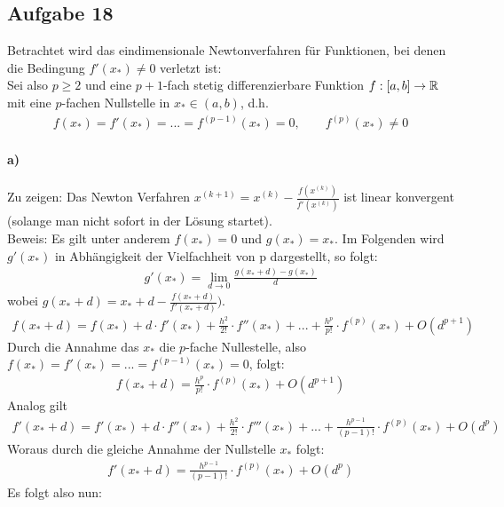 \subsection*{Aufgabe 18}
Betrachtet wird das eindimensionale Newtonverfahren für Funktionen, bei denen die Bedingung $f'(x_*) \neq 0$ verletzt ist:\\
Sei also $p \ge 2$ und eine $p+1$-fach stetig differenzierbare Funktion $f:[a,b] \rightarrow \mathbb R$ mit eine $p$-fachen Nullstelle in $x_* \in (a,b)$, d.h.
\begin{align*}
f(x_*) = f'(x_*) = ... = f^{(p-1)}(x_*) = 0, \qquad f^{(p)}(x_*) \neq 0
\end{align*}

\paragraph*{a)}
Zu zeigen: Das Newton Verfahren $x^{(k+1)}=x^{(k)} - \frac{f(x^{(k)})}{f'(x^{(k)})}$ ist linear konvergent (solange man nicht sofort in der Lösung startet).\\
Beweis: Es gilt unter anderem $f(x_*) = 0$ und $g(x_*) = x_*$. Im Folgenden wird $g'(x_*)$ in Abhängigkeit der Vielfachheit von p dargestellt, so folgt:
\begin{align*}
g'(x_*) = \lim\limits_{d \rightarrow 0} \frac{g(x_* +d) - g(x_*)}{d}
\end{align*}
wobei $g(x_*+d) = x_*+d-\frac{f(x_*+d)}{f'(x_*+d)})$.
\begin{align*}
f(x_*+d) = f(x_*) + d \cdot f'(x_*) +\frac{h^2}{2!}\cdot f''(x_*) + ... + \frac{h^p}{p!}\cdot f^{(p)}(x_*) + O(d^{p+1})
\end{align*}
Durch die Annahme das $x_*$ die $p$-fache Nullestelle, also $f(x_*) = f'(x_*) = ... = f^{(p-1)}(x_*) = 0$, folgt:
\begin{align*}
f(x_*+d) = \frac{h^p}{p!}\cdot f^{(p)}(x_*) + O(d^{p+1})
\end{align*}
Analog gilt
\begin{align*}
f'(x_*+d) = f'(x_*) + d \cdot f''(x_*) +\frac{h^2}{2!}\cdot f'''(x_*) + ... + \frac{h^{p-1}}{(p-1)!}\cdot f^{(p)}(x_*) + O(d^{p})
\end{align*}
Woraus durch die gleiche Annahme der Nullstelle $x_*$ folgt:
\begin{align*}
f'(x_*+d) = \frac{h^{p-1}}{(p-1)!}\cdot f^{(p)}(x_*) + O(d^{p})
\end{align*}
Es folgt also nun:
